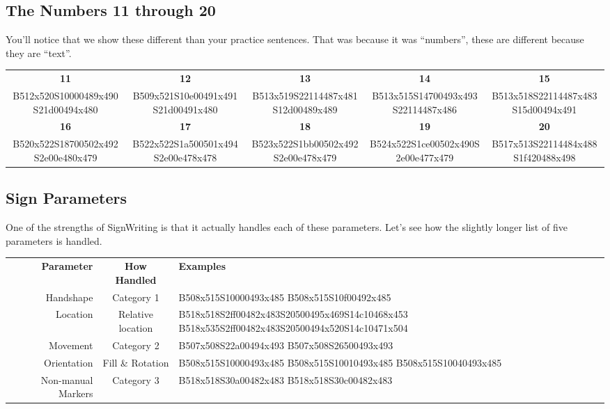 \documentclass{article}
\begin{document}
\subsection{The Numbers 11 through 20}

You'll notice that we show these different than your practice sentences.
That was because it was ``numbers'', these are different because they are ``text''.

\begin{center}
\begin{tabular}{*{5}{c}}
\textbf{11}&\textbf{12}&\textbf{13}&\textbf{14}&\textbf{15}\\
B512x520S10000489x490S21d00494x480&
B509x521S10e00491x491S21d00491x480&
B513x519S22114487x481S12d00489x489&
B513x515S14700493x493S22114487x486&
B513x518S22114487x483S15d00494x491\\
\textbf{16}&\textbf{17}&\textbf{18}&\textbf{19}&\textbf{20}\\
B520x522S18700502x492S2e00e480x479&
B522x522S1a500501x494S2e00e478x478&
B523x522S1bb00502x492S2e00e478x479&
B524x522S1ce00502x490S2e00e477x479&
B517x513S22114484x488S1f420488x498\\
\end{tabular}
\end{center}

\subsection{Sign Parameters}

One of the strengths of SignWriting is that it actually handles each of these parameters.
Let's see how the slightly longer list of five parameters is handled.

\begin{center}
\begin{tabular}{rcl}
\textbf{Parameter}&\textbf{How Handled}&\textbf{Examples}\\
Handshape         &Category 1       &B508x515S10000493x485 B508x515S10f00492x485\\
Location          &Relative location&B518x518S2ff00482x483S20500495x469S14c10468x453 B518x535S2ff00482x483S20500494x520S14c10471x504\\
Movement          &Category 2       &B507x508S22a00494x493 B507x508S26500493x493\\
Orientation       &Fill \& Rotation &B508x515S10000493x485 B508x515S10010493x485 B508x515S10040493x485\\
Non-manual Markers&Category 3       &B518x518S30a00482x483 B518x518S30c00482x483\\
\end{tabular}
\end{center}
\end{document}
